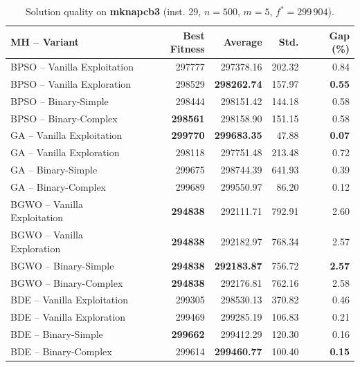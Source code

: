 \documentclass[journal,article,submit,moreauthors]{Definitions/mdpi}
\begin{document}
\begin{table}[htbp]
  \centering
  \small
  \caption{Solution quality on \textbf{mknapcb3} (inst. 29, $n=500$, $m=5$, $f^*=299\,904$).}
  \label{tab:calidad_mknapcb3_29}
  \begin{tabular}{lrrrr}
    \toprule
    \textbf{MH -- Variant} &
    \textbf{Best Fitness} &
    \textbf{Average} &
    \textbf{Std.} &
    \textbf{Gap (\%)} \\
    \midrule
    BPSO -- Vanilla Exploitation &         297777 &        297378.16 & 202.32 &         0.84 \\
    BPSO -- Vanilla Exploration  &         298529 & \textbf{298262.74} & 157.97 & \textbf{0.55} \\
    BPSO -- Binary-Simple        &         298444 &        298151.42 & 144.18 &         0.58 \\
    BPSO -- Binary-Complex       & \textbf{298561} &        298158.90 & 151.15 &         0.58 \\
    \midrule
    GA -- Vanilla Exploitation   & \textbf{299770} & \textbf{299683.35} &  47.88 & \textbf{0.07} \\
    GA -- Vanilla Exploration    &         298118 &        297751.48 & 213.48 &         0.72 \\
    GA -- Binary-Simple          &         299675 &        298744.39 & 641.93 &         0.39 \\
    GA -- Binary-Complex         &         299689 &        299550.97 &  86.20 &         0.12 \\
    \midrule
    BGWO -- Vanilla Exploitation & \textbf{294838} &        292111.71 & 792.91 &         2.60 \\
    BGWO -- Vanilla Exploration  & \textbf{294838} &        292182.97 & 768.34 &         2.57 \\
    BGWO -- Binary-Simple        & \textbf{294838} & \textbf{292183.87} & 756.72 & \textbf{2.57} \\
    BGWO -- Binary-Complex       & \textbf{294838} &        292176.81 & 762.16 &         2.58 \\
    \midrule
    BDE -- Vanilla Exploitation  &         299305 &        298530.13 & 370.82 &         0.46 \\
    BDE -- Vanilla Exploration   &         299469 &        299285.19 & 106.83 &         0.21 \\
    BDE -- Binary-Simple         & \textbf{299662} &        299412.29 & 120.30 &         0.16 \\
    BDE -- Binary-Complex        &         299614 & \textbf{299460.77} & 100.40 & \textbf{0.15} \\
    \bottomrule
  \end{tabular}
\end{table}
\end{document}
